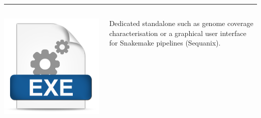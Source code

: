 \documentclass{beamer}
\begin{document}
\begin{frame}
\rule{\textwidth}{1pt}


\begin{columns}
\begin{column}{1.5cm}
\includegraphics[height=0.2\textheight]{images/exe.png}
\end{column}
\begin{column}{9cm}
Dedicated standalone such as genome coverage characterisation or a graphical 
user interface for Snakemake pipelines (Sequanix).
\end{column}
\end{columns}



\end{frame}
\end{document}
